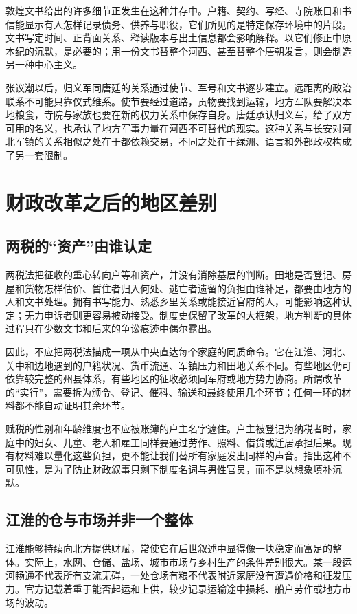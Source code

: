 敦煌文书给出的许多细节正发生在这种并存中。户籍、契约、写经、寺院账目和书信能显示有人怎样记录债务、供养与职役，它们所见的是特定保存环境中的片段。文书写定时间、正背面关系、释读版本与出土信息都会影响解释。以它们修正中原本纪的沉默，是必要的；用一份文书替整个河西、甚至替整个唐朝发言，则会制造另一种中心主义。

张议潮以后，归义军同唐廷的关系通过使节、军号和文书逐步建立。远距离的政治联系不可能只靠仪式维系。使节要经过道路，贡物要找到运输，地方军队要解决本地粮食，寺院与家族也要在新的权力关系中保存自身。唐廷承认归义军，给了双方可用的名义，也承认了地方军事力量在河西不可替代的现实。这种关系与长安对河北军镇的关系相似之处在于都依赖交易，不同之处在于绿洲、语言和外部政权构成了另一套限制。

\section{财政改革之后的地区差别}

\subsection{两税的“资产”由谁认定}
两税法把征收的重心转向户等和资产，并没有消除基层的判断。田地是否登记、房屋和货物怎样估价、暂住者归入何处、逃亡者遗留的负担由谁补足，都要由地方的人和文书处理。拥有书写能力、熟悉乡里关系或能接近官府的人，可能影响这种认定；无力申诉者则更容易被动接受。制度史保留了改革的大框架，地方判断的具体过程只在少数文书和后来的争讼痕迹中偶尔露出。

因此，不应把两税法描成一项从中央直达每个家庭的同质命令。它在江淮、河北、关中和边地遇到的户籍状况、货币流通、军镇压力和田地关系不同。有些地区仍可依靠较完整的州县体系，有些地区的征收必须同军府或地方势力协商。所谓改革的“实行”，需要拆为颁令、登记、催科、输送和最终使用几个环节；任何一环的材料都不能自动证明其余环节。

赋税的性别和年龄维度也不应被账簿的户主名字遮住。户主被登记为纳税者时，家庭中的妇女、儿童、老人和雇工同样要通过劳作、照料、借贷或迁居承担后果。现有材料难以量化这些负担，更不能让我们替所有家庭发出同样的声音。指出这种不可见性，是为了防止财政叙事只剩下制度名词与男性官员，而不是以想象填补沉默。

\subsection{江淮的仓与市场并非一个整体}
江淮能够持续向北方提供财赋，常使它在后世叙述中显得像一块稳定而富足的整体。实际上，水网、仓储、盐场、城市市场与乡村生产的条件差别很大。某一段运河畅通不代表所有支流无碍，一处仓场有粮不代表附近家庭没有遭遇价格和征发压力。官方记载着重于能否起运和上供，较少记录运输途中损耗、船户劳作或地方市场的波动。

